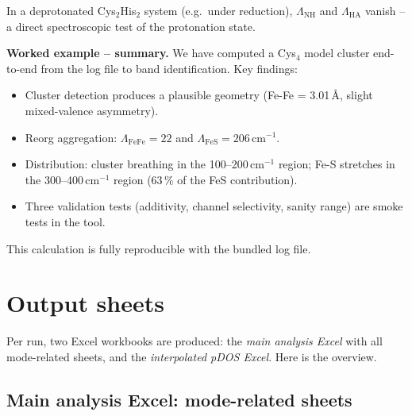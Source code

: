 \documentclass[11pt,a4paper,twoside]{article}
\providecommand{\angstrom}{\text{\AA}}    %
\theoremstyle{remark}
\begin{document}
In a deprotonated Cys$_2$His$_2$ system (e.g.\ under reduction),
$\Lambda_\text{NH}$ and $\Lambda_\text{HA}$ vanish -- a direct
spectroscopic test of the protonation state.

\begin{infobox}
\textbf{Worked example -- summary.} We have computed a
Cys$_4$ model cluster end-to-end from the log file to band
identification. Key findings:
\begin{itemize}\setlength{\itemsep}{0pt}
  \item Cluster detection produces a plausible geometry
        (Fe-Fe = 3.01\,$\angstrom$, slight mixed-valence
        asymmetry).
  \item Reorg aggregation: $\Lambda_\text{FeFe} = 22$ and
        $\Lambda_\text{FeS} = 206$\,cm$^{-1}$.
  \item Distribution: cluster breathing in the
        100--200\,cm$^{-1}$ region; Fe-S stretches in the
        300--400\,cm$^{-1}$ region (63\,\% of the FeS
        contribution).
  \item Three validation tests (additivity, channel selectivity,
        sanity range) are smoke tests in the tool.
\end{itemize}
This calculation is fully reproducible with the bundled log file.
\end{infobox}

\section{Output sheets}
\label{sec:ausgabe}

Per run, two Excel workbooks are produced: the \emph{main analysis
Excel} with all mode-related sheets, and the \emph{interpolated
pDOS Excel}. Here is the overview.

\subsection{Main analysis Excel: mode-related sheets}
\end{document}
